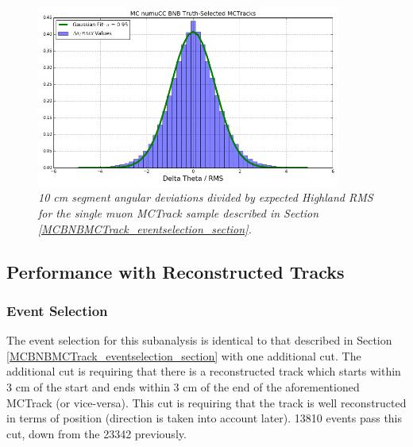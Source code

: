 \begin{figure}[ht!]
\begin{center}
\includegraphics[width=100mm]{Figures/Highland_validation_MCBNBMCTrack.png}
\end{center}
\caption{\textit{10 cm segment angular deviations divided by expected Highland RMS for the single muon {\sc MCTrack} sample described in Section \ref{MCBNBMCTrack_eventselection_section}.}}
\label{Highland_validation_MCTracks_fig}
\end{figure}




























\subsection{Performance with Reconstructed Tracks}\label{MCBNBRecoTrack_performance_section}

\subsubsection{Event Selection}\label{MCBNBRecoTrack_eventselection_section}
The event selection for this subanalysis is identical to that described in Section \ref{MCBNBMCTrack_eventselection_section} with one additional cut. The additional cut is requiring that there is a reconstructed track which starts within 3 cm of the start and ends within 3 cm of the end of the aforementioned {\sc MCTrack} (or vice-versa). This cut is requiring that the track is well reconstructed in terms of position (direction is taken into account later). 13810 events pass this cut, down from the 23342 previously.

